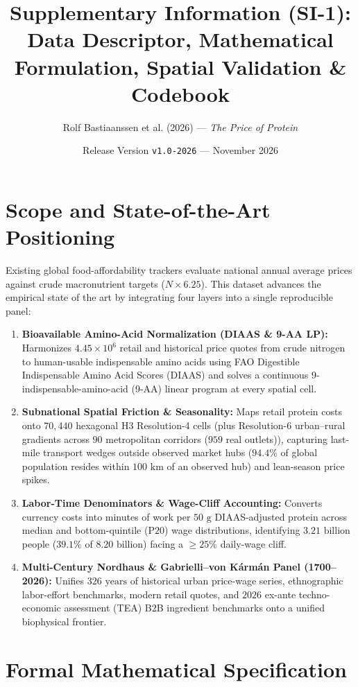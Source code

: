 \documentclass[11pt,a4paper]{article}
\title{\textbf{Supplementary Information (SI-1):} \\ Data Descriptor, Mathematical Formulation, Spatial Validation \& Codebook}
\author{Rolf Bastiaanssen et al. (2026) --- \textit{The Price of Protein}}
\date{Release Version \texttt{v1.0-2026} --- November 2026}
\begin{document}
\maketitle

\section{Scope and State-of-the-Art Positioning}
Existing global food-affordability trackers evaluate national annual average prices against crude macronutrient targets ($N \times 6.25$). This dataset advances the empirical state of the art by integrating four layers into a single reproducible panel:
\begin{enumerate}
    \item \textbf{Bioavailable Amino-Acid Normalization (DIAAS \& 9-AA LP):} Harmonizes $4.45 \times 10^6$ retail and historical price quotes from crude nitrogen to human-usable indispensable amino acids using FAO Digestible Indispensable Amino Acid Scores (DIAAS) and solves a continuous 9-indispensable-amino-acid (9-AA) linear program at every spatial cell.
    \item \textbf{Subnational Spatial Friction \& Seasonality:} Maps retail protein costs onto $70{,}440$ hexagonal H3 Resolution-4 cells (plus Resolution-6 urban--rural gradients across $90$ metropolitan corridors ($959$ real outlets)), capturing last-mile transport wedges outside observed market hubs ($94.4\%$ of global population resides within $100\text{ km}$ of an observed hub) and lean-season price spikes.
    \item \textbf{Labor-Time Denominators \& Wage-Cliff Accounting:} Converts currency costs into minutes of work per $50\text{ g}$ DIAAS-adjusted protein across median and bottom-quintile ($\text{P20}$) wage distributions, identifying $3.21\text{ billion}$ people ($39.1\%$ of $8.20\text{ billion}$) facing a $\ge 25\%$ daily-wage cliff.
    \item \textbf{Multi-Century Nordhaus \& Gabrielli--von K\'arm\'an Panel (1700--2026):} Unifies $326\text{ years}$ of historical urban price-wage series, ethnographic labor-effort benchmarks, modern retail quotes, and $2026$ ex-ante techno-economic assessment (TEA) B2B ingredient benchmarks onto a unified biophysical frontier.
\end{enumerate}

\section{Formal Mathematical Specification}
\end{document}

